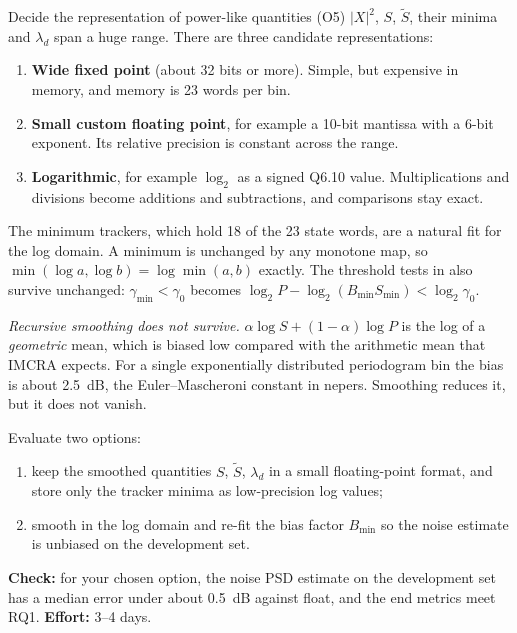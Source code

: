 \begin{stepbox}[label=st:codesign:log]{Decide the representation of power-like quantities (O5)}
$|X|^2$, $S$, $\tilde S$, their minima and $\lambda_d$ span a huge range.
There are three candidate representations:
\begin{enumerate}
  \item \textbf{Wide fixed point} (about 32 bits or more). Simple, but expensive
        in memory, and memory is 23 words per bin.
  \item \textbf{Small custom floating point}, for example a 10-bit mantissa with
        a 6-bit exponent. Its relative precision is constant across the range.
  \item \textbf{Logarithmic}, for example $\log_2$ as a signed Q6.10 value.
        Multiplications and divisions become additions and subtractions, and
        comparisons stay exact.
\end{enumerate}

The minimum trackers, which hold 18 of the 23 state words, are a natural fit for
the log domain. A minimum is unchanged by any monotone map, so
$\min(\log a,\log b)=\log\min(a,b)$ exactly. The threshold tests in
 also survive unchanged: $\gamma_\text{min}<\gamma_0$ becomes
$\log_2 P - \log_2(B_{\min}S_\text{min}) < \log_2\gamma_0$.

\emph{Recursive smoothing does not survive.} $\alpha\log S+(1-\alpha)\log P$ is
the log of a \emph{geometric} mean, which is biased low compared with the
arithmetic mean that IMCRA expects. For a single exponentially distributed
periodogram bin the bias is about \qty{2.5}{\dB}, the Euler--Mascheroni
constant in nepers. Smoothing reduces it, but it does not vanish.

Evaluate two options:
\begin{enumerate}[label=(\alph*)]
  \item keep the smoothed quantities $S$, $\tilde S$, $\lambda_d$ in a small
        floating-point format, and store only the tracker minima as
        low-precision log values;
  \item smooth in the log domain and re-fit the bias factor $B_{\min}$ so the
        noise estimate is unbiased on the development set.
\end{enumerate}

\textbf{Check:} for your chosen option, the noise PSD estimate on the
development set has a median error under about \qty{0.5}{\dB} against float,
and the end metrics meet RQ1. \textbf{Effort:} 3--4 days.
\end{stepbox}

